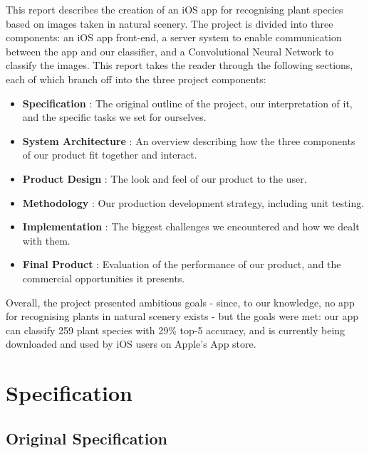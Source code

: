 \documentclass[a4paper,11pt]{article}
\begin{document}
This report describes the creation of an iOS app for recognising plant species based on images taken in natural scenery. The project is divided into three components: an iOS app front-end, a server system to enable communication between the app and our classifier, and a Convolutional Neural Network to classify the images. This report takes the reader through the following sections, each of which branch off into the three project components:
\begin{itemize}
 \item \textbf{Specification} : The original outline of the project, our interpretation of it, and the specific tasks we set for ourselves.
 \item \textbf{System Architecture} : An overview describing how the three components of our product fit together and interact.
 \item \textbf{Product Design} : The look and feel of our product to the user.
 \item \textbf{Methodology} : Our production development strategy, including unit testing.
 \item \textbf{Implementation} : The biggest challenges we encountered and how we dealt with them.
 \item \textbf{Final Product} : Evaluation of the performance of our product, and the commercial opportunities it presents.
\end{itemize}
 
Overall, the project presented ambitious goals - since, to our knowledge, no app for recognising plants in natural scenery exists - but the goals were met: our app can classify 259 plant species with 29\% top-5 accuracy, and is currently being downloaded and used by iOS users on Apple's App store.

\clearpage

\section{Specification}

\subsection{Original Specification}


\end{document}
